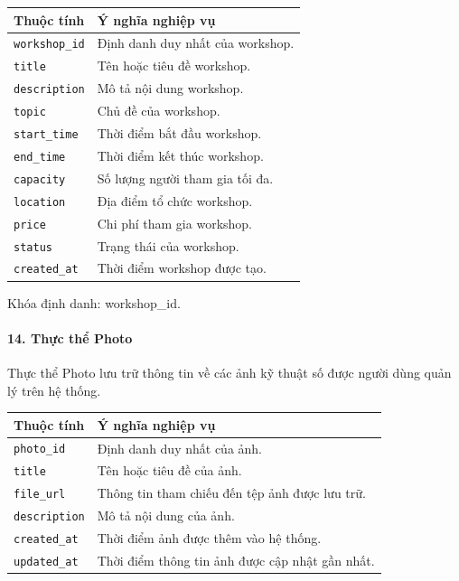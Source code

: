 \begin{center}
\scriptsize
\begin{tabular}{p{.25\linewidth} p{.65\linewidth}}
\toprule
Thuộc tính & Ý nghĩa nghiệp vụ \\
\midrule
\texttt{workshop\_id} & Định danh duy nhất của workshop. \\
\texttt{title} & Tên hoặc tiêu đề workshop. \\
\texttt{description} & Mô tả nội dung workshop. \\
\texttt{topic} & Chủ đề của workshop. \\
\texttt{start\_time} & Thời điểm bắt đầu workshop. \\
\texttt{end\_time} & Thời điểm kết thúc workshop. \\
\texttt{capacity} & Số lượng người tham gia tối đa. \\
\texttt{location} & Địa điểm tổ chức workshop. \\
\texttt{price} & Chi phí tham gia workshop. \\
\texttt{status} & Trạng thái của workshop. \\
\texttt{created\_at} & Thời điểm workshop được tạo. \\
\bottomrule
\end{tabular}
\end{center}

Khóa định danh: workshop\_id.

\paragraph{14. Thực thể Photo}\mbox{}\par

Thực thể Photo lưu trữ thông tin về các ảnh kỹ thuật số được người dùng quản lý trên hệ thống.

\begin{center}
\scriptsize
\begin{tabular}{p{.25\linewidth} p{.65\linewidth}}
\toprule
Thuộc tính & Ý nghĩa nghiệp vụ \\
\midrule
\texttt{photo\_id} & Định danh duy nhất của ảnh. \\
\texttt{title} & Tên hoặc tiêu đề của ảnh. \\
\texttt{file\_url} & Thông tin tham chiếu đến tệp ảnh được lưu trữ. \\
\texttt{description} & Mô tả nội dung của ảnh. \\
\texttt{created\_at} & Thời điểm ảnh được thêm vào hệ thống. \\
\texttt{updated\_at} & Thời điểm thông tin ảnh được cập nhật gần nhất. \\
\bottomrule
\end{tabular}
\end{center}

